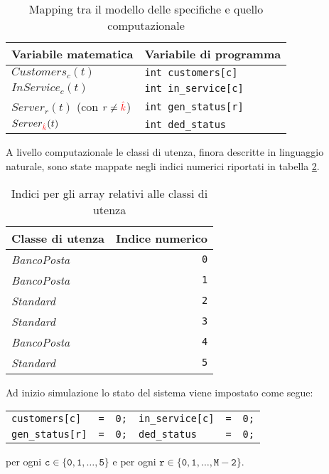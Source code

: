 \begin{table}[ht]
\centering
{\tablecolors
\begin{tabular}{| l | l |}
\hline
Variabile matematica & Variabile di programma \\
\hline
$Customers_c(t)$ & \texttt{{\color{code_purple}int} customers[c]} \\
\hline
$InService_c(t)$ & \texttt{{\color{code_purple}int} in\_service[c]} \\
\hline
$Server_r(t)$ {\small(con $r \neq {\color{red}\hat{k}}{}$)} & \texttt{{\color{code_purple}int} gen\_status[r]} \\
\hline
$Server_{\color{red}\hat{k}}(t)$ & \texttt{{\color{code_purple}int} ded\_status} \\
\hline
\end{tabular}}
\caption{Mapping tra il modello delle specifiche e quello computazionale}
\label{table:modello-computazionale-1}
\end{table}
\newpage
A livello computazionale le classi di utenza, finora descritte in linguaggio naturale, sono state mappate negli indici numerici riportati in tabella \ref{table:modello-computazionale-2}.
\begin{table}[ht]
\centering
{\tablecolors
\begin{tabular}{| l | r |}
\hline
Classe di utenza & Indice numerico \\
\hline
\uo{} \textsl{BancoPosta} & \texttt{0} \\
\hline
\pp{} \textsl{BancoPosta} & \texttt{1} \\
\hline
\uo{} \textsl{Standard} & \texttt{2} \\
\hline
\pp{} \textsl{Standard} & \texttt{3} \\
\hline
\sr{} \textsl{BancoPosta} & \texttt{4} \\
\hline
\sr{} \textsl{Standard} & \texttt{5} \\
\hline
\end{tabular}}
\caption{Indici per gli array relativi alle classi di utenza}
\label{table:modello-computazionale-2}
\end{table}

Ad inizio simulazione lo stato del sistema viene impostato come segue:
\begin{center}
\begin{tabular}{l l l l l l}
\texttt{customers[c]} & \texttt{=} & \texttt{0;} & \texttt{in\_service[c]} & \texttt{=} & \texttt{0;} \\
\texttt{gen\_status[r]} & \texttt{=} & \texttt{0;} & \texttt{ded\_status} & \texttt{=} & \texttt{0;}
\end{tabular}
\end{center}
per ogni $\mathtt{c\in \lbrace 0, 1, \dots, 5 \rbrace}$ e per ogni $\mathtt{r\in \lbrace 0, 1, \dots, M-2 \rbrace}$.

